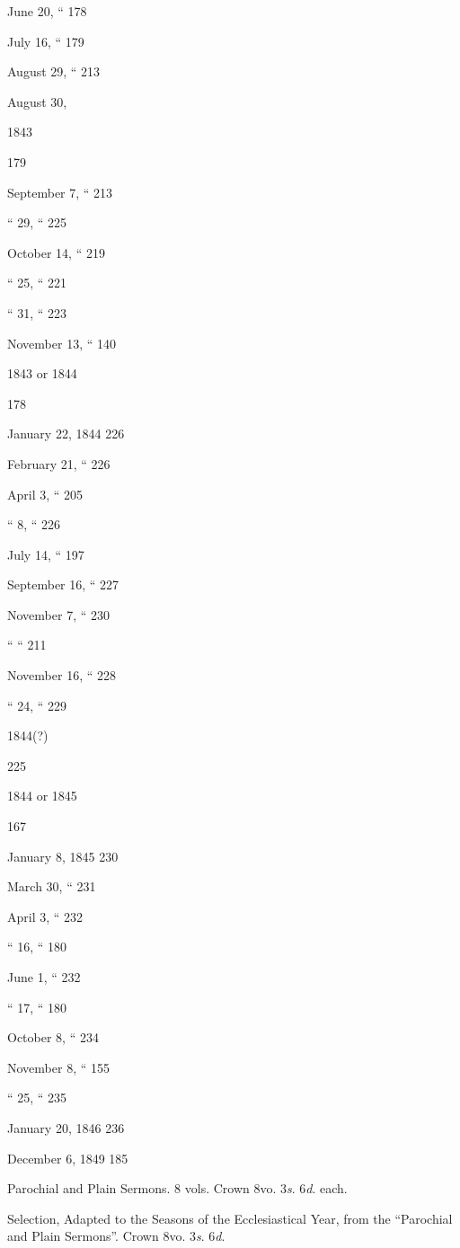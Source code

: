 June 20,
``
178

July 16,
``
179

August 29,
``
213

August 30,

1843

179

September 7,
``
213

`` 29,
``
225

October 14,
``
219

`` 25,
``
221

`` 31,
``
223

November 13,
``
140

1843 or 1844

178

January 22,
1844
226

February 21,
``
226

April 3,
``
205

`` 8,
``
226

July 14,
``
197

September 16,
``
227

November 7,
``
230

``
``
211

November 16,
``
228

`` 24,
``
229

1844(?)

225

1844 or
1845

167

January 8,
1845
230

March 30,
``
231

April 3,
``
232

`` 16,
``
180

June 1,
``
232

`` 17,
``
180

October 8,
``
234

November 8,
``
155

`` 25,
``
235

January 20,
1846
236

December 6,
1849
185




Parochial and Plain Sermons. 8 vols. Crown 8vo. 3\emph{s}.
6\emph{d}. each.

Selection, Adapted to the Seasons of the
Ecclesiastical Year, from the “Parochial and Plain Sermons''.
Crown 8vo. 3\emph{s}. 6\emph{d}.

